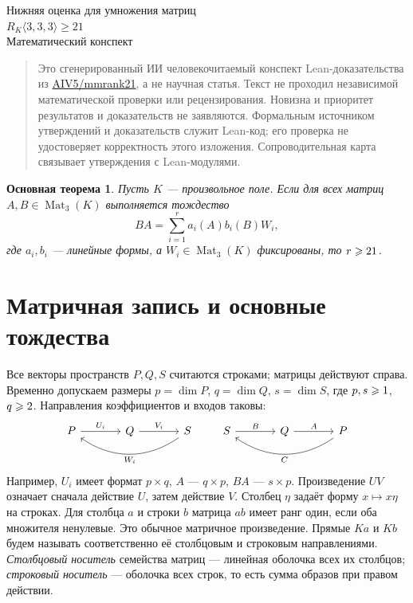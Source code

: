 \documentclass[11pt,a4paper]{article}
\numberwithin{equation}{section}
\theoremstyle{plain}
\newtheorem*{maintheorem}{Основная теорема}
\theoremstyle{definition}
\DeclareMathOperator{\Mat}{Mat}\DeclareMathOperator{\Span}{span}
\begin{document}
\begin{center}
{\LARGE Нижняя оценка для умножения матриц}\\[6pt]
{\Large $R_K\langle3,3,3\rangle\geqslant21$}\\[8pt]
{\normalsize Математический конспект}
\end{center}
\begin{quote}\small
Это сгенерированный ИИ человекочитаемый конспект Lean-доказательства
из \href{https://github.com/AIV5/mmrank21}{AIV5/mmrank21}, а не научная
статья. Текст не проходил независимой математической проверки или
рецензирования. Новизна и приоритет результатов и доказательств
не заявляются. Формальным источником утверждений и доказательств
служит Lean-код; его проверка не удостоверяет корректность этого
изложения. Сопроводительная карта связывает утверждения с Lean-модулями.
\end{quote}
\begin{maintheorem}
Пусть $K$ --- произвольное поле. Если для всех матриц $A,B\in\Mat_3(K)$
выполняется тождество
\[
 BA=\sum_{i=1}^{r} a_i(A)b_i(B)W_i,
\]
где $a_i,b_i$ --- линейные формы, а $W_i\in\Mat_3(K)$ фиксированы,
то $r\geqslant21$.
\end{maintheorem}

\tableofcontents
\newpage
\section{Матричная запись и основные тождества}

Все векторы пространств $P,Q,S$ считаются строками; матрицы действуют
справа. Временно допускаем размеры $p=\dim P$, $q=\dim Q$, $s=\dim S$,
где $p,s\geqslant1$, $q\geqslant2$.
Направления коэффициентов и входов таковы:
\[
\begin{tikzcd}[column sep=large]
 P\arrow[r,"U_i"] & Q\arrow[r,"V_i"] & S\arrow[ll,bend left=35,"W_i"]
\end{tikzcd}
\qquad
\begin{tikzcd}[column sep=large]
 S\arrow[r,"B"]&Q\arrow[r,"A"]&P\arrow[ll,bend left=35,"C"]
\end{tikzcd}
\]
Например, $U_i$ имеет формат $p\times q$, $A$ --- $q\times p$,
$BA$ --- $s\times p$. Произведение $UV$ означает сначала действие $U$,
затем действие $V$. Столбец $\eta$ задаёт форму $x\mapsto x\eta$ на строках.
Для столбца $a$ и строки $b$ матрица $ab$ имеет ранг один, если оба
множителя ненулевые. Это обычное матричное произведение.
Прямые $Ka$ и $Kb$ будем называть соответственно её столбцовым
и строковым направлениями.
\emph{Столбцовый носитель} семейства матриц --- линейная оболочка всех
их столбцов; \emph{строковый носитель} --- оболочка всех строк,
то есть сумма образов при правом действии.
\end{document}
